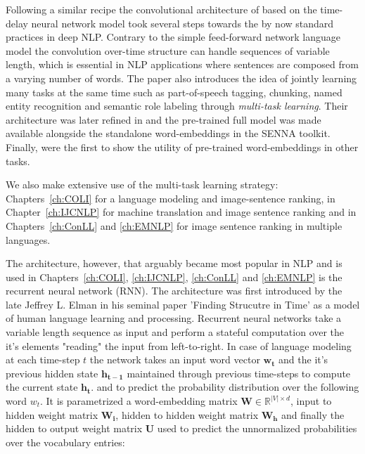 Following a similar recipe the convolutional architecture of \cite{collobert2008unified}
based on the time-delay neural network model \citep{waibel1990phoneme} took several steps towards the
by now standard practices in deep NLP.
Contrary to the simple feed-forward network language model the convolution over-time structure can handle
sequences of variable length, which is essential in NLP applications where sentences
are composed from a varying number of words.
The paper also introduces the idea of jointly learning many tasks at the same time such as part-of-speech
tagging, chunking, named entity recognition and semantic role labeling through \emph{multi-task learning}.
Their architecture was later refined in \cite{collobert2011natural} and the pre-trained
full model was made available alongside the standalone word-embeddings in the SENNA toolkit.
Finally, \cite{collobert2008unified} were the first to show the utility of pre-trained word-embeddings
in other tasks. 

We also make extensive use of the multi-task learning strategy:  Chapters~\ref{ch:COLI} for
a language modeling and image-sentence ranking, in Chapter~\ref{ch:IJCNLP} for machine translation
and image sentence ranking and in Chapters~\ref{ch:ConLL} and \ref{ch:EMNLP} for image sentence ranking
in multiple languages.


The architecture, however, that arguably became most popular in NLP and is used in
Chapters~\ref{ch:COLI}, \ref{ch:IJCNLP}, \ref{ch:ConLL} and \ref{ch:EMNLP} 
is the recurrent neural network (RNN). The architecture was
first introduced by the late Jeffrey L. Elman in his seminal paper  'Finding Strucutre in Time'
 \citep{elman1990finding}
as a model of human language learning and processing. Recurrent neural networks
take a variable length sequence as input and perform a stateful computation over the it's elements "reading"
the input from left-to-right.
In case of language modeling at each time-step $t$ the network takes an input word vector $\mathbf{w_t}$
and the it's previous hidden state $\mathbf{h_{t-1}}$ maintained through previous 
time-steps to compute the current
state $\mathbf{h_t}$. and to predict the probability distribution over the following word $w_t$.
It is parametrized a word-embedding matrix $\mathbf{W} \in \mathbb{R}^{|V| \times d}$, 
input to hidden weight matrix $\mathbf{W_i}$, hidden to hidden weight 
matrix $\mathbf{W_h}$ and finally the hidden to output
weight matrix $\mathbf{U}$ used to predict the unnormalized probabilities over the vocabulary entries:

